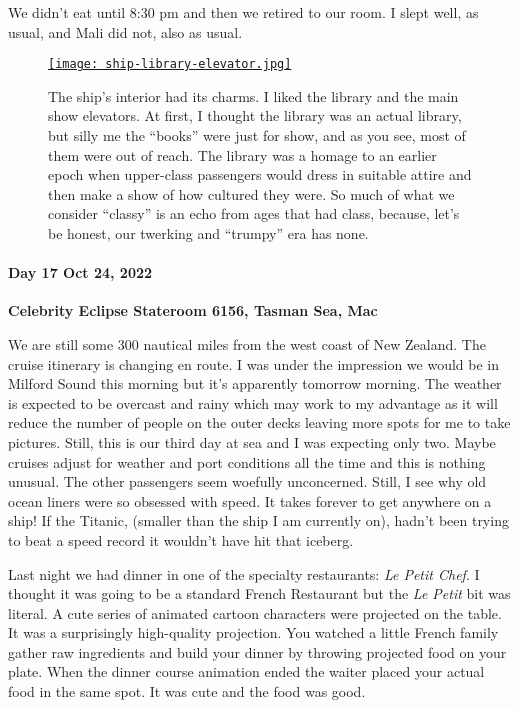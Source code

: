 We didn't eat until 8:30 pm and then we retired to our room. I slept
well, as usual, and Mali did not, also as usual.


\captionsetup[figure]{labelformat=empty}
\begin{figure}[htbp]
\centering
\href{https://conceptcontrol.smugmug.com/Trips/Overseas/Australia-New-Zealand-2022/i-4m5CvVC/A}{\texttt{[image: ship-library-elevator.jpg]}}
\caption[Ship library and show elevator]{The ship's interior had its charms. I liked the library and the
main show elevators. At first, I thought the library was an actual
library, but silly me the ``books'' were just for show, and as you see,
most of them were out of reach. The library was a homage to an earlier
epoch when upper-class passengers would dress in suitable attire and
then make a show of how cultured they were. So much of what we consider
``classy'' is an echo from ages that had class, because, let's be
honest, our twerking and ``trumpy'' era has none.}
\label{fig:7606x1}
\end{figure}

\hypertarget{day-17-oct-24-2022}{%
\paragraph{\texorpdfstring{\textbf{Day 17 Oct 24, 2022}}{Day 17 Oct 24, 2022}}\label{day-17-oct-24-2022}}

\textbf{Celebrity Eclipse Stateroom 6156, Tasman Sea, Mac}

We are still some 300 nautical miles from the west coast of New Zealand.
The cruise itinerary is changing en route. I was under the impression we
would be in Milford Sound this morning but it's apparently tomorrow
morning. The weather is expected to be overcast and rainy which may work
to my advantage as it will reduce the number of people on the outer
decks leaving more spots for me to take pictures. Still, this is our
third day at sea and I was expecting only two. Maybe cruises adjust for
weather and port conditions all the time and this is nothing unusual.
The other passengers seem woefully unconcerned. Still, I see why old
ocean liners were so obsessed with speed. It takes forever to get
anywhere on a ship! If the Titanic, (smaller than the ship I am
currently on), hadn't been trying to beat a speed record it wouldn't
have hit that iceberg.

Last night we had dinner in one of the specialty restaurants: \emph{Le
Petit Chef}. I thought it was going to be a standard French Restaurant
but the \emph{Le Petit} bit was literal. A cute series of animated
cartoon characters were projected on the table. It was a surprisingly
high-quality projection. You watched a little French family gather raw
ingredients and build your dinner by throwing projected food on your
plate. When the dinner course animation ended the waiter placed your
actual food in the same spot. It was cute and the food was good.

